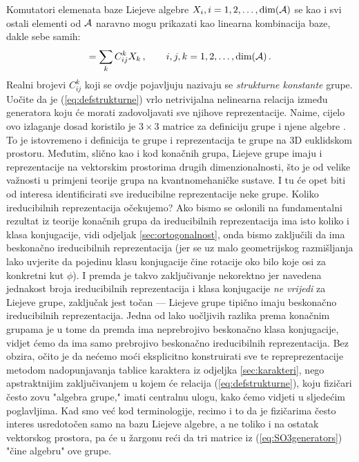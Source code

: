 Komutatori elemenata baze Liejeve algebre $X_i, i=1,2,\ldots, \textrm{dim}(\mathcal{A})$ se
kao i svi ostali elementi od $\mathcal{A}$ naravno mogu prikazati kao linearna kombinacija baze, dakle
sebe samih: 
\begin{equation}
 [X_i, X_j]= \sum_k C_{ij}^{k} X_k \,,  \qquad i,j,k=1,2,\ldots, \textrm{dim}(\calA) \,.
 \label{eq:defstrukturne}
\end{equation}
Realni brojevi $C_{ij}^{k}$ koji se ovdje pojavljuju nazivaju se \emph{strukturne konstante} grupe.
Uočite da je (\ref{eq:defstrukturne}) vrlo netrivijalna nelinearna relacija između
generatora koju će morati zadovoljavati sve njihove reprezentacije.  Naime, cijelo ovo
izlaganje dosad koristilo je $3\times 3$ matrice za definiciju grupe  i njene
algebre . To je istovremeno i definicija te grupe i reprezentacija te grupe 
na 3D euklidskom prostoru.
Međutim, slično kao i kod konačnih grupa, Liejeve grupe imaju i
reprezentacije na vektorskim prostorima drugih dimenzionalnosti, što je od velike
važnosti u primjeni teorije grupa na kvantnomehaničke sustave. I tu će opet biti od interesa
identificirati sve ireducibilne reprezentacije neke grupe. Koliko ireducibilnih
reprezentacija očekujemo? Ako bismo se oslonili na fundamentalni rezultat iz teorije
konačnih grupa da ireducibilnih reprezentacija ima isto koliko i klasa konjugacije,
vidi odjeljak \ref{sec:ortogonalnost}, onda bismo zaključili da  ima beskonačno
ireducibilnih reprezentacija (jer se uz malo geometrijskog razmišljanja lako uvjerite
da pojedinu klasu konjugacije čine rotacije oko bilo koje osi za konkretni kut $\phi$).
I premda je takvo zaključivanje nekorektno jer navedena jednakost broja ireducibilnih
reprezentacija i klasa konjugacije \emph{ne vrijedi} za Liejeve grupe, zaključak jest
točan --- Liejeve grupe tipično imaju beskonačno ireducibilnih reprezentacija.
Jedna od lako uočljivih razlika prema konačnim grupama je u tome da premda
 ima neprebrojivo beskonačno klasa konjugacije, vidjet ćemo da ima samo prebrojivo
beskonačno ireducibilnih reprezentacija.
Bez obzira, očito je da nećemo moći eksplicitno konstruirati sve te repreprezentacije
metodom nadopunjavanja tablice karaktera iz odjeljka \ref{sec:karakteri},
nego apstraktnijim zaključivanjem u kojem će
relacija (\ref{eq:defstrukturne}), koju fizičari često zovu "algebra grupe," imati
centralnu ulogu, kako ćemo vidjeti u sljedećim poglavljima.
Kad smo već kod terminologije, recimo i to da je fizičarima često interes usredotočen
samo na bazu Liejeve algebre, a ne toliko i na ostatak vektorskog prostora, pa će u žargonu
reći da tri matrice iz (\ref{eq:SO3generators}) "čine algebru" ove grupe.


